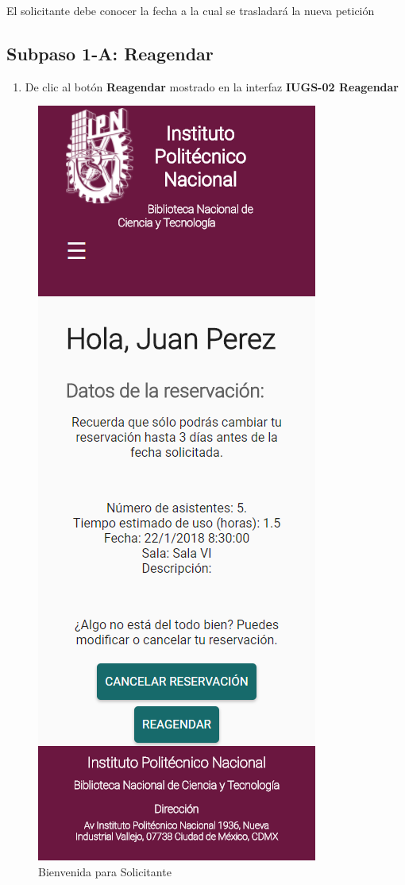 El solicitante debe conocer la fecha a la cual se trasladará la nueva
petición

\subsection{Subpaso 1-A: Reagendar}
\begin{enumerate}
	\item De clic al botón  \textbf{Reagendar} mostrado en la interfaz  \textbf{IUGS-02 Reagendar}
\end{enumerate}

	\begin{figure}[hbtp]	
		\includegraphics[scale=0.3]{images/InterfazMovil/IUGS05_binevenida.png}
		\caption{Bienvenida para Solicitante}
	\end{figure}